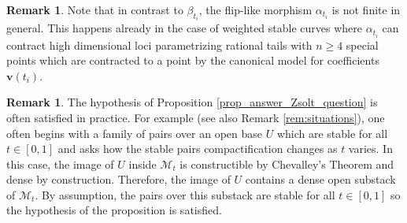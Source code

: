 \documentclass[11pt]{amsart}
\theoremstyle{definition}
\newtheorem{remark}[theorem]{Remark}
\theoremstyle{remark}
\newcommand{\sM}{\mathscr{M}}
\newcommand{\bfv}{\mathbf{v}}
\begin{document}
	\begin{remark}\label{remark:alpha:not:finite} Note that in contrast to $\beta_{t_i}$, the flip-like morphism $\alpha_{t_i}$ is not finite in general. This happens already in the case of weighted stable curves \cite{Hassett} where $\alpha_{t_i}$ can contract high dimensional loci parametrizing rational tails with $n \geq 4$ special points which are contracted to a point by the canonical model for coefficients $\bfv(t_i)$. 
	\end{remark}
	
	\begin{remark}\label{remark:alpha:often:birational} The hypothesis of Proposition \ref{prop_answer_Zsolt_question} is often satisfied in practice. For example (see also Remark \ref{rem:situations}), one often begins with a family of pairs over an open base $U$ which are stable for all $t \in [0,1]$ and asks how the stable pairs compactification changes as $t$ varies. In this case, the image of $U$ inside $\sM_{t}$ is constructible by Chevalley's Theorem and dense by construction. Therefore, the image of $U$ contains a dense open substack of $\sM_t$. By assumption, the pairs over this substack are stable for all $t \in [0,1]$ so the hypothesis of the proposition is satisfied. 
	\end{remark}
	
\end{document}
